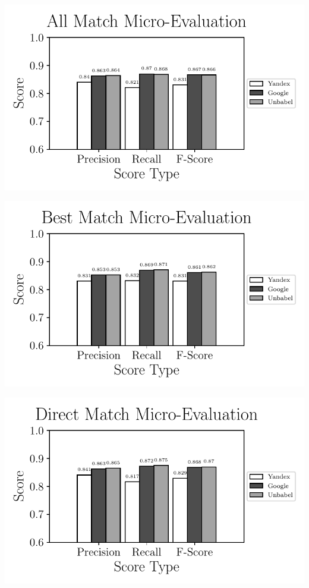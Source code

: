 \includegraphics{SupportFiles/plots/all_match_micro_total_plot.pdf}

\includegraphics{SupportFiles/plots/best_match_micro_total_plot.pdf}

\includegraphics{SupportFiles/plots/direct_match_micro_total_plot.pdf}


